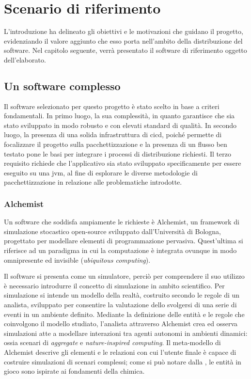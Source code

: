 
\chapter{Scenario di riferimento}\label{chap:scenery}

L'introduzione ha delineato gli obiettivi e le motivazioni che guidano il progetto, evidenziando il valore aggiunto che esso porta nell'ambito della distribuzione del software. Nel capitolo seguente, verrà presentato il software di riferimento oggetto dell'elaborato.

\section{Un software complesso}\label{sec:alchemist}
Il software selezionato per questo progetto è stato scelto in base a criteri fondamentali. In primo luogo, la sua complessità, in quanto garantisce che sia stato sviluppato in modo robusto e con elevati standard di qualità. In secondo luogo, la presenza di una solida infrastruttura di \ac{cicd}, poiché permette di focalizzare il progetto sulla pacchettizzazione e la presenza di un flusso ben testato pone le basi per integrare i processi di distribuzione richiesti. Il terzo requisito richiede che l'applicativo sia stato sviluppato specificamente per essere eseguito su una \ac{jvm}, al fine di esplorare le diverse metodologie di pacchettizzazione in relazione alle problematiche introdotte.

\subsection{Alchemist}

Un software che soddisfa ampiamente le richieste è Alchemist\cite{Pianini_2013}, un framework di simulazione stocastico open-source sviluppato dall'Università di Bologna, progettato per modellare elementi di programmazione pervasiva. Quest'ultima si riferisce ad un paradigma in cui la computazione è integrata ovunque in modo omnipresente ed invisible (\textit{ubiquitous computing}). 


Il software si presenta come un simulatore, perciò per comprendere il suo utilizzo è necessario introdurre il concetto di simulazione in ambito scientifico. Per simulazione si intende un modello della realtà, costruito secondo le regole di un analista, sviluppato per consentire la valutazione dello svolgersi di una serie di eventi in un ambiente definito. Mediante la definizione delle entità e le regole che coinvolgono il modello studiato, l'analista attraverso Alchemist crea ed osserva simulazioni atte a modellare interazioni tra agenti autonomi in ambienti dinamici: ossia scenari di \textit{aggregate} e \textit{nature-inspired computing}. Il meta-modello di Alchemist descrive gli elementi e le relazioni con cui l'utente finale è capace di costruire simulazioni di scenari complessi; come si può notare dalla , le entità in gioco sono ispirate ai fondamenti della chimica. 

